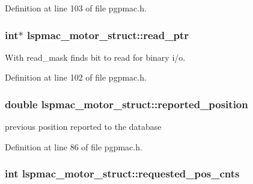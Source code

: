 Definition at line 103 of file pgpmac.\-h.

\hypertarget{structlspmac__motor__struct_a844b28ccabab5048ca216db074fb9704}{
\subsubsection[{read\-\_\-ptr}]{\setlength{\rightskip}{0pt plus 5cm}int$\ast$ lspmac\-\_\-motor\-\_\-struct\-::read\-\_\-ptr}}\label{structlspmac__motor__struct_a844b28ccabab5048ca216db074fb9704}


With read\-\_\-mask finds bit to read for binary i/o. 



Definition at line 102 of file pgpmac.\-h.

\hypertarget{structlspmac__motor__struct_ae5f1f605a0f587500e627332ad4e5e7e}{
\subsubsection[{reported\-\_\-position}]{\setlength{\rightskip}{0pt plus 5cm}double lspmac\-\_\-motor\-\_\-struct\-::reported\-\_\-position}}\label{structlspmac__motor__struct_ae5f1f605a0f587500e627332ad4e5e7e}


previous position reported to the database 



Definition at line 86 of file pgpmac.\-h.

\hypertarget{structlspmac__motor__struct_a6e8dc9c11dc52a439fe9837230f93ce2}{
\subsubsection[{requested\-\_\-pos\-\_\-cnts}]{\setlength{\rightskip}{0pt plus 5cm}int lspmac\-\_\-motor\-\_\-struct\-::requested\-\_\-pos\-\_\-cnts}}\label{structlspmac__motor__struct_a6e8dc9c11dc52a439fe9837230f93ce2}



